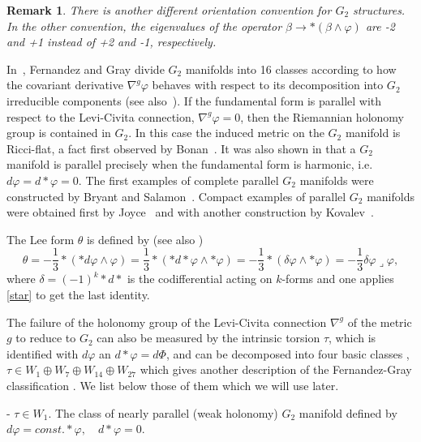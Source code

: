 \documentclass[10pt,british]{article}
\newtheorem{rmrk}[thrm]{Remark}
\def\sb {{\nabla}}
\def\LC{{\nabla^g}}
\def\p{{\varphi}}
\def\ph{{\Phi}}
\begin{document}
\begin{rmrk}\label{remconv}There is another different orientation convention for $G_2$ structures.
In the other convention, the eigenvalues of the operator $\beta\rightarrow *(\beta\wedge\p)$ are -2 and +1 instead of +2 and -1, respectively. 
\end{rmrk}

In~\cite{FG}, Fernandez and Gray divide $G_2$ manifolds into 16 classes
according to how the covariant derivative $\LC\p$ %
behaves with respect to its decomposition into $G_2$ irreducible components
(see also~\cite{CSal,GKMW,Br1}).  If the fundamental form is parallel with respect to
the Levi-Civita connection, $\LC\p=0$,
 then the Riemannian holonomy group is contained
in $G_2$. In this case the induced metric on the
$G_2$ manifold is Ricci-flat, a fact first observed by Bonan~\cite{Bo}.  It
was also shown in \cite{FG} that a $G_2$ manifold
is parallel precisely when the fundamental form is harmonic, i.e. $d\p=d*\p=0$.
The first examples of complete parallel $G_2$ manifolds were constructed by Bryant and
Salamon~\cite{BS,Gibb}.  Compact examples of parallel $G_2$ manifolds were
obtained first by Joyce~\cite{J1,J2,J3} and  with another construction by Kovalev~\cite{Kov}.

The Lee form $\theta$ is defined by \cite{Cabr} (see also \cite{Br})
\begin{equation}\label{g2li}
\theta=-\frac{1}{3}*(* d\p\wedge\p)=\frac13*(*d*\p\wedge *\p)=-\frac13*(\delta\p\wedge*\p)=-\frac13\delta\p\lrcorner\p,
\end{equation}
where $\delta=(-1)^k*d*$ is the codifferential  acting on $k$-forms  and one applies \eqref{star} to get the last identity.



The failure of the holonomy group of the Levi-Civita connection $\sb^g$ of the metric $g$ to reduce to $G_2$
can also be measured by the intrinsic torsion $\tau$, which is identified with $d\p$ an $d*\p=d\ph$, 
and can be decomposed into four basic classes \cite{CSal,Br1}, $\tau \in W_1\oplus W_7 \oplus W_{14}\oplus W_{27}$ which gives another description of the Fernandez-Gray classification \cite{FG}.  We list below those of them which
we will use later.

\noindent - $\tau \in W_1$. The class of nearly parallel  (weak holonomy) $G_2$ manifold defined by
$d\p=const.*\p, \quad d*\p=0$.
\end{document}
